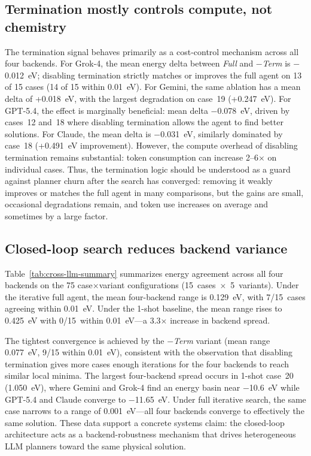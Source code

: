 \subsection{Termination mostly controls compute, not chemistry}

The termination signal behaves primarily as a cost-control mechanism across all four backends.
For Grok-4, the mean energy delta between \textit{Full} and \textit{$-$Term} is $-$0.012~eV; disabling termination strictly matches or improves the full agent on 13 of 15 cases (14 of 15 within 0.01~eV).
For Gemini, the same ablation has a mean delta of +0.018~eV, with the largest degradation on case~19 (+0.247~eV).
For GPT-5.4, the effect is marginally beneficial: mean delta $-$0.078~eV, driven by cases~12 and~18 where disabling termination allows the agent to find better solutions.
For Claude, the mean delta is $-$0.031~eV, similarly dominated by case~18 (+0.491~eV improvement).
However, the compute overhead of disabling termination remains substantial: token consumption can increase 2--6$\times$ on individual cases.
Thus, the termination logic should be understood as a guard against planner churn after the search has converged: removing it weakly improves or matches the full agent in many comparisons, but the gains are small, occasional degradations remain, and token use increases on average and sometimes by a large factor.

\subsection{Closed-loop search reduces backend variance}

Table~\ref{tab:cross-llm-summary} summarizes energy agreement across all four backends on the 75 case$\times$variant configurations (15~cases~$\times$~5~variants).
Under the iterative full agent, the mean four-backend range is 0.129~eV, with 7/15~cases agreeing within 0.01~eV.
Under the 1-shot baseline, the mean range rises to 0.425~eV with 0/15~within 0.01~eV---a 3.3$\times$ increase in backend spread.

The tightest convergence is achieved by the \textit{$-$Term} variant (mean range 0.077~eV, 9/15 within 0.01~eV), consistent with the observation that disabling termination gives more cases enough iterations for the four backends to reach similar local minima.
The largest four-backend spread occurs in 1-shot case~20 (1.050~eV), where Gemini and Grok-4 find an energy basin near $-$10.6~eV while GPT-5.4 and Claude converge to $-$11.65~eV.
Under full iterative search, the same case narrows to a range of 0.001~eV---all four backends converge to effectively the same solution.
These data support a concrete systems claim: the closed-loop architecture acts as a backend-robustness mechanism that drives heterogeneous LLM planners toward the same physical solution.

